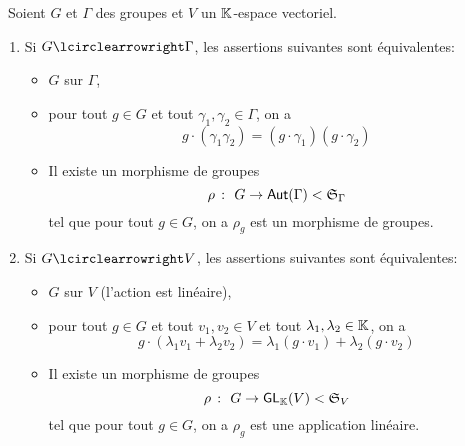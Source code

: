 \begin{definition}\,
    Soient \(G\) et \(\Gamma\) des groupes et \(V\) un \(\mathbb{K}\)-espace vectoriel.
    \begin{enumerate}[label=(\roman*)] %
        \item Si \(G\act\Gamma\), les assertions suivantes sont équivalentes:
        \begin{itemize}
            \item \(G\)  sur \(\Gamma\),
            \item pour tout \(g\in G\) et tout \(\gamma_1,\gamma_2\in\Gamma\), on a
            \begin{equation*}
                g\cdot(\gamma_1\gamma_2) = (g\cdot\gamma_1)(g\cdot\gamma_2)
            \end{equation*}
            \item Il existe un morphisme de groupes
            \begin{equation*}
                \rho\ \colon\ G\to\operatorname{\mathsf{Aut}}(\Gamma) < {\mathfrak{S}}_\Gamma
            \end{equation*}
            tel que pour tout \(g\in G\), on a \(\rho_g\) est un morphisme de groupes.
        \end{itemize}
        
        \item Si \(G\act V\), les assertions suivantes sont équivalentes:
        \begin{itemize}
            \item \(G\)  sur \(V\) (l'action est linéaire),
            \item pour tout \(g\in G\) et tout \(v_1,v_2\in V\) et tout \(\lambda_1,\lambda_2\in\mathbb{K}\), on a
            \begin{equation*}
                g\cdot(\lambda_1 v_1 + \lambda_2 v_2) = \lambda_1(g\cdot v_1) + \lambda_2(g\cdot v_2)
            \end{equation*}
            \item Il existe un morphisme de groupes
            \begin{equation*}
                \rho\ \colon\ G\to\mathsf{GL}_{\mathbb{K}}(V) < {\mathfrak{S}}_V
            \end{equation*}
            tel que pour tout \(g\in G\), on a \(\rho_g\) est une application linéaire.
        \end{itemize}
    \end{enumerate}
\end{definition}

